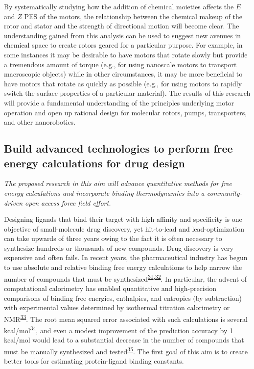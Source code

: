 \documentclass[11pt,notitlepage]{article}
\begin{document}
By systematically studying how the addition of chemical moieties affects
the \(E\) and \(Z\) PES of the motors, the relationship between the
chemical makeup of the rotor and stator and the strength of directional
motion will become clear. The understanding gained from this analysis
can be used to suggest new avenues in chemical space to create rotors
geared for a particular purpose. For example, in some instances it may
be desirable to have motors that rotate slowly but provide a tremendous
amount of torque (e.g., for using nanoscale motors to transport
macroscopic objects) while in other circumstances, it may be more
beneficial to have motors that rotate as quickly as possible (e.g., for
using motors to rapidly switch the surface properties of a particular
material). The results of this research will provide a fundamental
understanding of the principles underlying motor operation and open up
rational design for molecular rotors, pumps, transporters, and other
nanorobotics.

\hypertarget{build-advanced-technologies-to-perform-free-energy-calculations-for-drug-design}{%
\subsection{Build advanced technologies to perform free energy
calculations for drug
design}\label{build-advanced-technologies-to-perform-free-energy-calculations-for-drug-design}}

\emph{The proposed research in this aim will advance quantitative
methods for free energy calculations and incorporate binding
thermodynamics into a community-driven open access force field effort.}

Designing ligands that bind their target with high affinity and
specificity is one objective of small-molecule drug discovery, yet
hit-to-lead and lead-optimization can take upwards of three years owing
to the fact it is often necessary to synthesize hundreds or thousands of
new compounds. Drug discovery is very expensive and often fails. In
recent years, the pharmaceutical industry has begun to use absolute and
relative binding free energy calculations to help narrow the number of
compounds that must be
synthesized\textsuperscript{\protect\hyperlink{ref-1FiDpP1LR}{31},\protect\hyperlink{ref-1BwXH3GFO}{32}}.
In particular, the advent of computational calorimetry has enabled
quantitative and high-precision comparisons of binding free energies,
enthalpies, and entropies (by subtraction) with experimental values
determined by isothermal titration calorimetry or
NMR\textsuperscript{\protect\hyperlink{ref-1935a9V0d}{33}}. The root
mean squared error associated with such calculations is several
kcal/mol\textsuperscript{\protect\hyperlink{ref-LWd10vQy}{34}}, and even
a modest improvement of the prediction accuracy by 1 kcal/mol would lead
to a substantial decrease in the number of compounds that must be
manually synthesized and
tested\textsuperscript{\protect\hyperlink{ref-fC0t6Cy1}{35}}. The first
goal of this aim is to create better tools for estimating protein-ligand
binding constants.
\end{document}
